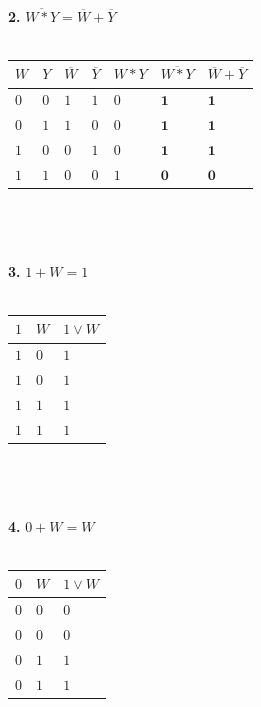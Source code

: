 \documentclass[a4paper]{article}
\begin{document}
\\
\\
\\
\textbf{2.} $\overline{W * Y} = \overline{W} + \overline{Y}$ \\
\\
\begin{tabu} to 0.8\textwidth { | X[c] | X[c] | X[c] | X[c] | X[c] | X[c] | X[c] | }
 \hline
 $W$ & $Y$  & $\overline{W}$ & $ \overline{Y}$ & $W * Y$ & $\overline{W * Y}$ & $\overline{W} + \overline{Y}$\\
 \hline
 $0$  & $0$  & $1$ & $1$ & $0$ & $\textbf{1}$ & $\textbf{1}$\\
 \hline
 $0$  & $1$  & $1$ & $0$ & $0$ & $\textbf{1}$ & $\textbf{1}$\\
 \hline
 $1$  & $0$  & $0$ & $1$ & $0$ & $\textbf{1}$ & $\textbf{1}$\\
 \hline
 $1$  & $1$  & $0$ & $0$ & $1$ & $\textbf{0}$ & $\textbf{0}$\\
\hline
\end{tabu}
\\
\\
\\
\textbf{3.} $1 + W = 1$ \\
\\
\begin{tabu} to 0.8\textwidth { | X[c] | X[c] | X[c] | }
 \hline
 $1$ & $W$  & $1 \vee W$\\
 \hline
 $1$  & $0$  & $1$\\
 \hline
 $1$  & $0$  & $1$\\
 \hline
 $1$  & $1$  & $1$\\
 \hline
 $1$  & $1$  & $1$\\
\hline
\end{tabu}
\\
\\
\\
\textbf{4.} $0 + W = W$ \\
\\
\begin{tabu} to 0.8\textwidth { | X[c] | X[c] | X[c] | }
 \hline
 $0$ & $W$  & $1 \vee W$\\
 \hline
 $0$  & $0$  & $0$\\
 \hline
 $0$  & $0$  & $0$\\
 \hline
 $0$  & $1$  & $1$\\
 \hline
 $0$  & $1$  & $1$\\
\hline
\end{tabu}
\\
\\
\end{document}
